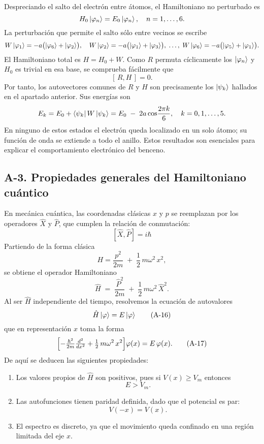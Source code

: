 \documentclass[a4paper,11pt]{article}
\begin{document}
Despreciando el salto del electrón entre átomos, el Hamiltoniano no perturbado es
\[
H_0\ket{\varphi_n}=E_0\ket{\varphi_n},\quad n=1,\dots,6.
\]
La perturbación que permite el salto sólo entre vecinos se escribe
\[
W\ket{\varphi_1} = -a\bigl(\ket{\varphi_6}+\ket{\varphi_2}\bigr),\quad
W\ket{\varphi_2} = -a\bigl(\ket{\varphi_1}+\ket{\varphi_3}\bigr),\;\dots,\;
W\ket{\varphi_6} = -a\bigl(\ket{\varphi_5}+\ket{\varphi_1}\bigr).
\]
El Hamiltoniano total es \(H=H_0+W\). Como \(R\) permuta cíclicamente los \(\ket{\varphi_n}\) y \(H_0\) es trivial en esa base, se comprueba fácilmente que
\[
[\,R,H\,]=0.
\]
Por tanto, los autovectores comunes de \(R\) y \(H\) son precisamente los \(\ket{\psi_k}\) hallados en el apartado anterior. Sus energías son
\[
E_k = E_0 + \bra{\psi_k}W\ket{\psi_k}
= E_0 \;-\;2a\cos\!\frac{2\pi k}{6},
\quad k=0,1,\dots,5.
\]
En ninguno de estos estados el electrón queda localizado en un solo átomo; su función de onda se extiende a todo el anillo. Estos resultados son esenciales para explicar el comportamiento electrónico del benceno.



\subsection*{A-3. Propiedades generales del Hamiltoniano cuántico}

En mecánica cuántica, las coordenadas clásicas \(x\) y \(p\) se reemplazan por los operadores \(\hat X\) y \(\hat P\), que cumplen la relación de conmutación:
\[
[\hat X,\hat P]=i\hbar
\tag{A-14}
\]
Partiendo de la forma clásica
\[
H=\frac{p^2}{2m} \;+\;\frac12\,m\omega^2\,x^2,
\]
se obtiene el operador Hamiltoniano
\[
\hat H \;=\; \frac{\hat P^2}{2m} \;+\;\frac12\,m\omega^2\,\hat X^2.
\tag{A-15}
\]
Al ser \(\hat H\) independiente del tiempo, resolvemos la ecuación de autovalores
\[
\hat H\ket{\varphi}=E\ket{\varphi}
\tag{A-16}
\]
que en representación \(x\) toma la forma
\[
\Bigl[-\tfrac{\hbar^2}{2m}\tfrac{d^2}{dx^2} + \tfrac12\,m\omega^2\,x^2\Bigr]\varphi(x)
= E\,\varphi(x).
\tag{A-17}
\]
De aquí se deducen las siguientes propiedades:
\begin{enumerate}
  \item Los valores propios de \(\hat H\) son positivos, pues si \(V(x)\ge V_m\) entonces
  \[
    E>V_m.
    \tag{A-18}
  \]
  \item Las autofunciones tienen paridad definida, dado que el potencial es par:
  \[
    V(-x)=V(x).
    \tag{A-19}
  \]
  \item El espectro es discreto, ya que el movimiento queda confinado en una región limitada del eje \(x\).
\end{enumerate}
\end{document}
